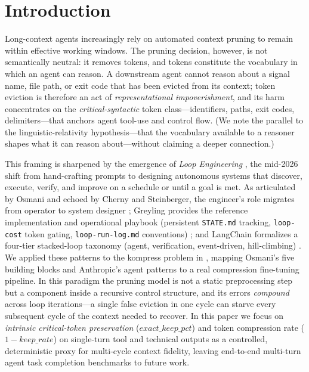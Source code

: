 \section{Introduction}
\label{sec:introduction}

Long-context agents increasingly rely on automated context pruning to remain
within effective working windows. The pruning decision, however, is not
semantically neutral: it removes tokens, and tokens constitute the vocabulary
in which an agent can reason. A downstream agent cannot
reason about a signal name, file path, or exit code that has been evicted from
its context; token eviction is therefore an act of \emph{representational
impoverishment}, and its harm concentrates on the \emph{critical-syntactic}
token class---identifiers, paths, exit codes, delimiters---that anchors agent
tool-use and control flow. (We note the parallel to the linguistic-relativity
hypothesis---that the vocabulary available to a reasoner shapes what it can
reason about---without claiming a deeper connection.)

This framing is sharpened by the emergence of \emph{Loop Engineering}
\citep{osmani2026loop}, the mid-2026 shift from hand-crafting prompts to
designing autonomous systems that discover, execute, verify, and improve on a
schedule or until a goal is met. As articulated by Osmani and echoed by
Cherny and Steinberger, the engineer's role migrates from operator to system
designer \citep{osmani2026oreilly}; Greyling provides the reference
implementation and operational playbook (persistent \texttt{STATE.md}
tracking, \texttt{loop-cost} token gating, \texttt{loop-run-log.md}
conventions) \citep{greyling2026loop}; and LangChain formalizes a four-tier
stacked-loop taxonomy (agent, verification, event-driven, hill-climbing)
\citep{langchain2026loops}. We applied these patterns to the kompress problem
in \citet{lodri2026loopapplied}, mapping Osmani's five building blocks and
Anthropic's agent patterns to a real compression fine-tuning pipeline. In this
paradigm the pruning model is not a static
preprocessing step but a component inside a recursive control structure, and
its errors \emph{compound} across loop iterations---a single false eviction in
one cycle can starve every subsequent cycle of the context needed to recover.
In this paper we focus on \emph{intrinsic critical-token preservation}
($\mathit{exact\_keep\_pct}$) and token compression rate
($1-\mathit{keep\_rate}$) on single-turn tool and technical outputs as a
controlled, deterministic proxy for multi-cycle context fidelity, leaving
end-to-end multi-turn agent task completion benchmarks to future work.

